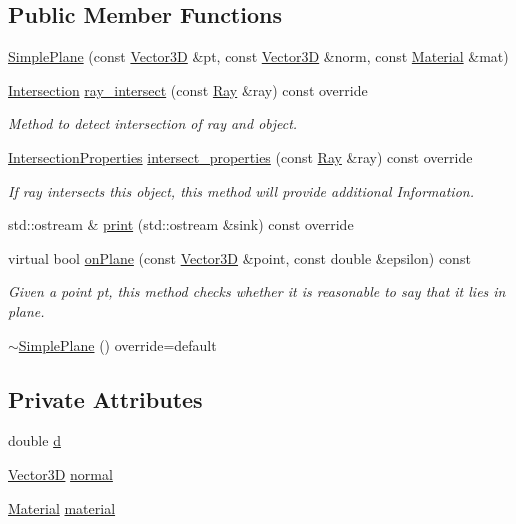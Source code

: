 \subsection*{Public Member Functions}
\begin{DoxyCompactItemize}
\item 
\mbox{\hyperlink{classSimplePlane_a4536573a977f9d4c30334f9c4aab6a1d}{Simple\+Plane}} (const \mbox{\hyperlink{classVector3D}{Vector3D}} \&pt, const \mbox{\hyperlink{classVector3D}{Vector3D}} \&norm, const \mbox{\hyperlink{classMaterial}{Material}} \&mat)
\item 
\mbox{\hyperlink{classIntersection}{Intersection}} \mbox{\hyperlink{classSimplePlane_adffd7f102bed30d44cd527cb34a3a312}{ray\+\_\+intersect}} (const \mbox{\hyperlink{classRay}{Ray}} \&ray) const override
\begin{DoxyCompactList}\small\item\em Method to detect intersection of ray and object. \end{DoxyCompactList}\item 
\mbox{\hyperlink{classIntersectionProperties}{Intersection\+Properties}} \mbox{\hyperlink{classSimplePlane_a29180f657d6932226dc91ebe92143608}{intersect\+\_\+properties}} (const \mbox{\hyperlink{classRay}{Ray}} \&ray) const override
\begin{DoxyCompactList}\small\item\em If ray intersects this object, this method will provide additional Information. \end{DoxyCompactList}\item 
std\+::ostream \& \mbox{\hyperlink{classSimplePlane_afc8014126bb264e11e7b2b470a8a90a1}{print}} (std\+::ostream \&sink) const override
\item 
virtual bool \mbox{\hyperlink{classSimplePlane_af7bd46c5bb092902a42696d2962f94d3}{on\+Plane}} (const \mbox{\hyperlink{classVector3D}{Vector3D}} \&point, const double \&epsilon) const
\begin{DoxyCompactList}\small\item\em Given a point pt, this method checks whether it is reasonable to say that it lies in plane. \end{DoxyCompactList}\item 
\mbox{\hyperlink{classSimplePlane_abc63c5079688f3d1826a7f2ed5f9db3f}{$\sim$\+Simple\+Plane}} () override=default
\end{DoxyCompactItemize}
\subsection*{Private Attributes}
\begin{DoxyCompactItemize}
\item 
double \mbox{\hyperlink{classSimplePlane_a84850a97b34a8616c7ffdd51c30a5dc9}{d}}
\item 
\mbox{\hyperlink{classVector3D}{Vector3D}} \mbox{\hyperlink{classSimplePlane_a222f5d12aed966bc2764abc90b622037}{normal}}
\item 
\mbox{\hyperlink{classMaterial}{Material}} \mbox{\hyperlink{classSimplePlane_a04307eae806daa2cd2f1c471224b44cf}{material}}
\end{DoxyCompactItemize}


